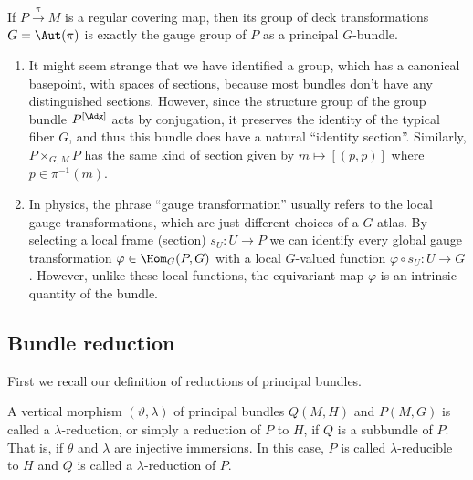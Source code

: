 \begin{example}
    If $P\overset{\pi}{\to} M$ is a regular covering map, then its group of deck transformations $G=\Aut(\pi)$ is exactly the gauge group of $P$ as a principal $G$-bundle.
\end{example}


\begin{rem}
    \begin{enumerate}
        \item It might seem strange that we have identified a group, which has a canonical basepoint, with spaces of sections, because most bundles don't have any distinguished sections. However, since the structure group of the group bundle $P^{[\Adg]}$ acts by conjugation, it preserves the identity of the typical fiber $G$, and thus this bundle does have a natural ``identity section''. Similarly, $P\times_{G,M}P$ has the same kind of section given by $m\mapsto [(p,p)]$ where $p\in \pi^{-1}(m)$.
        \item In physics, the phrase ``gauge transformation'' usually refers to the local gauge transformations, which are just different choices of a $G$-atlas. By selecting a local frame (section) $s_U:U\to P$ we can identify every global gauge transformation $\varphi\in \Hom_G(P,G)$ with a local $G$-valued  function $\varphi\circ s_U:U\to G$. However, unlike these local functions, the equivariant map $\varphi$ is an intrinsic quantity of the bundle.
    \end{enumerate}
\end{rem}





\subsection{Bundle reduction}\label{sec: bundle reduction}

First we recall our definition of reductions of principal bundles.

\begin{defn}
    A vertical morphism $(\vartheta,\lambda)$ of principal bundles $Q(M,H)$ and $P(M,G)$ is called a $\lambda$-reduction, or simply a reduction of $P$ to $H$, if $Q$ is a subbundle of $P$. That is, if $\theta$ and $\lambda$ are injective immersions. In this case, $P$ is called $\lambda$-reducible to $H$ and $Q$ is called a $\lambda$-reduction of $P$.
\end{defn}

